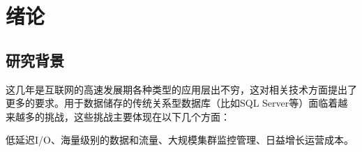 \documentclass{zjutthesis}
\begin{document}



\frontmatter



\tableofcontents           %

\listoffigures             %
\listoftables              %


\mainmatter


\chapter{绪论}
\section{研究背景}
这几年是互联网的高速发展期各种类型的应用层出不穷，这对相关技术方面提出了更多的要求。用于数据储存的传统关系型数据库\cite{刘云生2001现代数据库技术}（比如SQL Server等）面临着越来越多的挑战，这些挑战主要体现在以下几个方面：

低延迟I/O、海量级别的数据和流量、大规模集群监控管理、日益增长运营成本。
\end{document}
